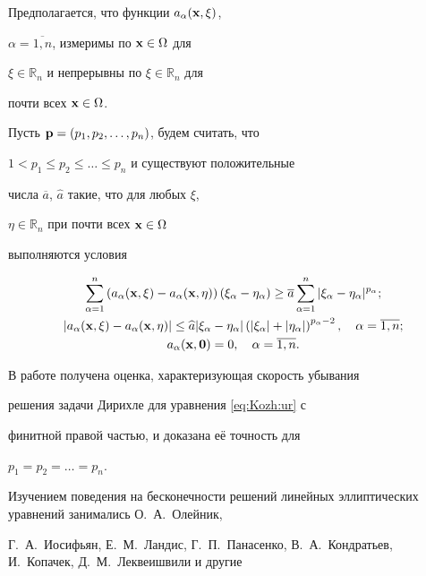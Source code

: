 Предполагается, что функции $a_{\alpha}({\bf x},\xi)$,

$\alpha=\overline{1, n}$,  измеримы по ${\bf x}\in \Omega$ для

$\xi\in\mathbb{R}_{n}$ и непрерывны по $\xi\in\mathbb{R}_{n}$ для

почти всех ${\bf x}\in\Omega$.

 Пусть  ${\bf p}=(p_1,p_2,\ldots,p_n)$, будем считать, что

$1<p_1\leq p_2\leq \ldots \leq p_n$ и существуют положительные

числа $\overline{a}$, $\widehat{a}$ такие, что для любых $\xi$,

$\eta\in\mathbb{R}_{n}$ при почти всех ${\bf x}\in\Omega$

выполняются условия

\begin{gather}

\sum\limits_{\alpha=1}^{n}\left(a_{\alpha}({\bf

x},\xi)-a_{\alpha}({\bf

x},\eta)\right)\left(\xi_{\alpha}-\eta_{\alpha}\right)

\geq\overline{a}\sum\limits_{\alpha=1}^{n}|\xi_{\alpha}-\eta_{\alpha}|^{p_\alpha};\label{eq:Kozh:us1}\\

|a_{\alpha}({\bf x},\xi)-a_{\alpha}({\bf

x},\eta)|\leq\widehat{a}|\xi_{\alpha}-\eta_{\alpha}|\left(|\xi_{\alpha}|+|\eta_{\alpha}|\right)^{p_{\alpha}-2},

\quad \alpha=\overline{1,n};\label{eq:Kozh:us2}\\

a_{\alpha}({\bf x},{\bf 0})=0, \quad

\alpha=\overline{1,n}.\label{eq:Kozh:us3}

\end{gather}



В работе получена оценка, характеризующая  скорость убывания

решения задачи Дирихле для уравнения  \eqref{eq:Kozh:ur} с

финитной правой частью, и доказана её точность для

$p_1=p_2=\ldots=p_n$.



Изучением поведения на бесконечности решений линейных эллиптических уравнений  занимались О.~А.~Олейник,

Г.~А.~Иосифьян, Е.~М.~Ландис, Г.~П.~Панасенко, В.~А.~Кондратьев, И.~Копачек, Д.~М.~Леквеишвили и другие

